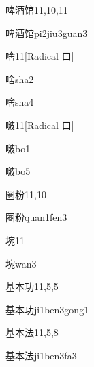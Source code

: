 \begin{entry}{啤酒馆}{11,10,11}
  \begin{phonetics}{啤酒馆}{pi2jiu3guan3}
  \end{phonetics}
\end{entry}

\begin{entry}{啥}{11}[Radical 口]
  \begin{phonetics}{啥}{sha2}
  \end{phonetics}
  \begin{phonetics}{啥}{sha4}
  \end{phonetics}
\end{entry}

\begin{entry}{啵}{11}[Radical 口]
  \begin{phonetics}{啵}{bo1}
  \end{phonetics}
  \begin{phonetics}{啵}{bo5}
  \end{phonetics}
\end{entry}

\begin{entry}{圈粉}{11,10}
  \begin{phonetics}{圈粉}{quan1fen3}
  \end{phonetics}
\end{entry}

\begin{entry}{埦}{11}
  \begin{phonetics}{埦}{wan3}
  \end{phonetics}
\end{entry}

\begin{entry}{基本功}{11,5,5}
  \begin{phonetics}{基本功}{ji1ben3gong1}
  \end{phonetics}
\end{entry}

\begin{entry}{基本法}{11,5,8}
  \begin{phonetics}{基本法}{ji1ben3fa3}
  \end{phonetics}
\end{entry}

